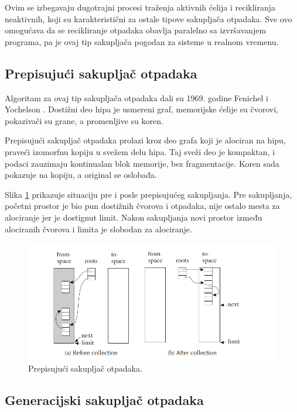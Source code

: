 Ovim se izbegavaju dugotrajni procesi traženja aktivnih ćelija i recikliranja neaktivnih, koji su karakteristični za ostale tipove sakupljača otpadaka. Sve ovo omogućava da se recikliranje otpadaka obavlja paralelno sa izvršavanjem programa, pa je ovaj tip sakupljača pogodan za sisteme u realnom vremenu.

\subsection{Prepisujući sakupljač otpadaka}

Algoritam za ovaj tip sakupljača otpadaka dali su 1969. godine Fenichel i
Yochelson \cite{feni69}. Dostižni deo hipa je usmereni graf, memorijske ćelije su čvorovi, pokazivači su grane, a promenljive su koren.

Prepisujući sakupljač otpadaka prolazi kroz deo grafa koji je alociran na hipu, praveći izomorfnu kopiju u svežem delu hipa. Taj sveži deo je kompaktan, i podaci zauzimaju kontinualan blok memorije, bez fragmentacije. Koren sada pokazuje na kopiju, a original se oslobađa. 

Slika \ref{fig:copygc} prikazuje situaciju pre i posle prepisujućeg sakupljanja. Pre sakupljanja, početni prostor je bio pun dostižnih čvorova i otpadaka, nije ostalo mesta za alociranje jer je dostignut limit. Nakon sakupljanja novi prostor između alociranih čvorova i limita je slobodan za alociranje.

\begin{figure}[h]
	\centering
	\includegraphics[scale=0.55]{copygc.png}
	\caption{Prepisujući sakupljač otpadaka.}
	\label{fig:copygc}
\end{figure}

\subsection{Generacijski sakupljač otpadaka}

